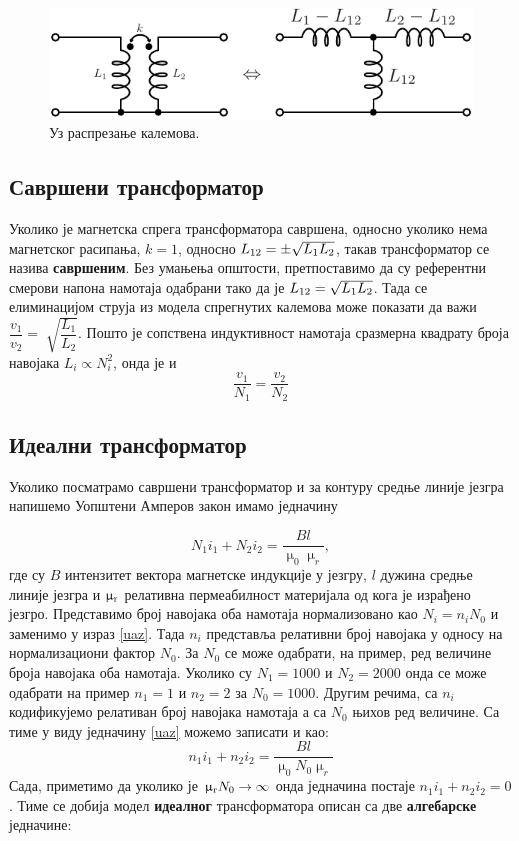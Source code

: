 \begin{figure}[ht!]
\centering
\includegraphics[scale=1]{fig/rasprezanje.pdf}
\caption{Уз распрезање калемова.}
\label{raspreg}
\end{figure}

\subsection{Савршени трансформатор}
Уколико је магнетска спрега трансформатора савршена, односно 
уколико нема магнетског расипања, $k = 1$, односно $L_{\rm 12} = \pm \sqrt{L_1 L_2}$,
такав трансформатор се назива \textbf{савршеним}. 
Без умањења  
општости, претпоставимо да су референтни смерови напона намотаја
одабрани тако да је $L_{\rm 12} = \sqrt{L_1 L_2}$. Тада се 
елиминацијом струја из модела спрегнутих калемова може показати да 
важи $\dfrac{v_1}{v_2 } = \sqrt[]{\dfrac{L_1}{L_2}}$. Пошто је 
сопствена индуктивност намотаја сразмерна квадрату броја навојака 
$L_i \propto N_i^2$, онда је и 
\begin{equation}
\boxed{
\dfrac{v_1}{N_1} = \dfrac{v_2}{N_2}
}
\end{equation}


\subsection{Идеални трансформатор}
Уколико посматрамо савршени трансформатор и за контуру средње 
линије језгра напишемо Уопштени Амперов закон имамо једначину 

\begin{equation}
N_1 i_1 + N_2 i_2 = \dfrac{B l}{\upmu_0 \upmu_r},
\label{uaz}
\end{equation}
где су 
$B$ интензитет вектора магнетске индукције у језгру, $l$ 
дужина средње линије језгра и $\upmu_{\rm r}$  релативна пермеабилност
материјала од кога је израђено језгро. Представимо број навојака оба намотаја нормализовано као $N_{i} = n_i N_0$ и заменимо у 
израз \eqref{uaz}. Тада $n_{i}$ представља релативни број 
навојака у односу на нормализациони фактор
$N_0$. За $N_0$ се може
одабрати, на пример, ред величине броја навојака оба намотаја. Уколико
су $N_1 = 1000$ и $N_2 = 2000$ онда се може одабрати на пример 
$n_1 = 1$ и $n_2 = 2$ за $N_0 = 1000$. Другим речима, са $n_i$ кодификујемо релативан број навојака намотаја а са $N_0$ њихов ред величине. Са тиме у виду 
једначину \eqref{uaz} можемо записати и као:
\begin{equation}
n_1 i_1 + n_2 i_2 = \dfrac{Bl}{\upmu_0 N_0 \upmu_r}
\end{equation}
Сада, приметимо да уколико је $\upmu_{\rm r}N_0 \to \infty$ онда 
једначина постаје $\boxed{n_1 i_1 + n_2 i_2 = 0}$. 
Тиме се добија модел \textbf{идеалног} 
трансформатора описан са две \textbf{алгебарске} једначине:


